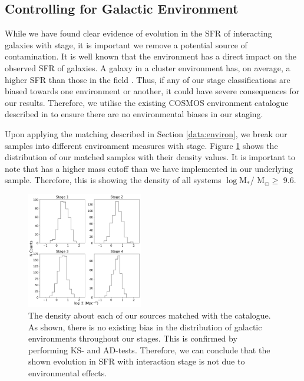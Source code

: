 \subsection{Controlling for Galactic Environment} \label{sec:env-cont}
\noindent While we have found clear evidence of evolution in the SFR of interacting galaxies with stage, it is important we remove a potential source of contamination. It is well known that the environment has a direct impact on the observed SFR of galaxies. A galaxy in a cluster environment has, on average, a higher SFR than those in the field \citep{2006MNRAS.373..469B}. Thus, if any of our stage classifications are biased towards one environment or another, it could have severe consequences for our results. Therefore, we utilise the existing COSMOS environment catalogue described in \citet{2017ApJ...837...16D} to ensure there are no environmental biases in our staging. 

Upon applying the matching described in Section \ref{data:environ}, we break our samples into different environment measures with stage. Figure \ref{fig:dens-stage} shows the distribution of our matched samples with their density values. It is important to note that \citet{2017ApJ...837...16D} has a higher mass cutoff than we have implemented in our underlying sample. Therefore, this is showing the density of all systems $\log$M$_*$/ M$_\odot \geq$ 9.6. 

\begin{figure}
    \centering
    \includegraphics[width=0.45\textwidth]{Chapter3/figures/density-stage.pdf}
    \caption{The density about each of our sources matched with the \citet{2017ApJ...837...16D} catalogue. As shown, there is no existing bias in the distribution of galactic environments throughout our stages. This is confirmed by performing KS- and AD-tests. Therefore, we can conclude that the shown evolution in SFR with interaction stage is not due to environmental effects.}
    \label{fig:dens-stage}
\end{figure}

